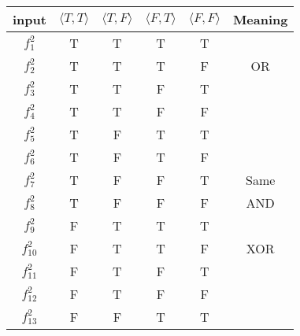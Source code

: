 \documentclass[12pt, letterpaper]{article}
\begin{document}
\begin{table}[H]
  \centering
  \begin{tabular}{|c|c|c|c|c|c|}
  \hline
  input      & $\langle T, T \rangle$ & $\langle T, F \rangle$ & $\langle F, T \rangle$ & $\langle F, F \rangle$ & Meaning \\ [1ex] \hline
  $f_1^2$    & T                      & T                      & T                      & T                      &         \\ [0.5ex] \hline
  $f_2^2$    & T                      & T                      & T                      & F                      & OR      \\ [0.5ex] \hline
  $f_3^2$    & T                      & T                      & F                      & T                      &         \\ [0.5ex] \hline
  $f_4^2$    & T                      & T                      & F                      & F                      &         \\ [0.5ex] \hline
  $f_5^2$    & T                      & F                      & T                      & T                      &         \\ [0.5ex] \hline
  $f_6^2$    & T                      & F                      & T                      & F                      &         \\ [0.5ex] \hline
  $f_7^2$    & T                      & F                      & F                      & T                      & Same    \\ [0.5ex] \hline
  $f_8^2$    & T                      & F                      & F                      & F                      & AND     \\ [0.5ex] \hline
  $f_9^2$    & F                      & T                      & T                      & T                      &         \\ [0.5ex] \hline
  $f_{10}^2$ & F                      & T                      & T                      & F                      & XOR     \\ [0.5ex] \hline
  $f_{11}^2$ & F                      & T                      & F                      & T                      &         \\ [0.5ex] \hline
  $f_{12}^2$ & F                      & T                      & F                      & F                      &         \\ [0.5ex] \hline
  $f_{13}^2$ & F                      & F                      & T                      & T                      &         \\ [0.5ex] \hline

\end{tabular}
\end{table}
\end{document}
